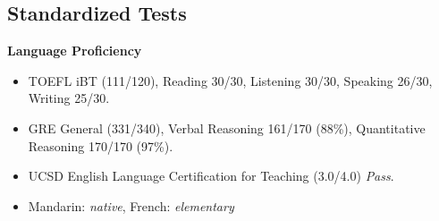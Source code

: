 \documentclass[margin]{res}
\begin{document}
\begin{resume}
		\section{\large{S}\normalsize{tandardized} \large{T}\normalsize{ests}}
        	\textbf {Language Proficiency}
        	\begin{itemize} \itemsep -2pt
        		\item TOEFL iBT (111/120), Reading 30/30, Listening 30/30, Speaking 26/30, Writing 25/30.
				\item GRE General (331/340), Verbal Reasoning 161/170 (88\%), Quantitative Reasoning 170/170 (97\%).
				\item UCSD English Language Certification for Teaching (3.0/4.0) \emph{Pass}.
				\item Mandarin:  \emph{native}, French:  \emph{elementary}
        	\end{itemize}
      
    \end{resume}
\end{document}
